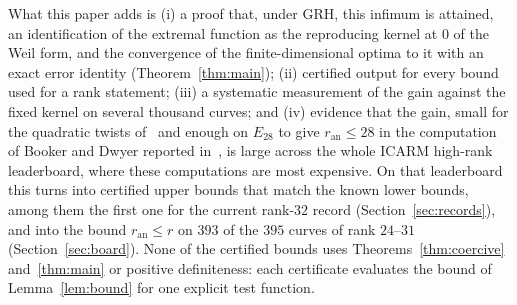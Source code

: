 \documentclass[11pt]{amsart}
\theoremstyle{remark}
\theoremstyle{definition}
\newcommand{\ran}{r_{\mathrm{an}}}
\begin{document}
What this paper adds is (i) a proof that, under GRH, this infimum is attained, an identification of the extremal function as the reproducing kernel at $0$ of the Weil form, and the convergence of the finite-dimensional optima to it with an exact error identity (Theorem~\ref{thm:main}); (ii) certified output for every bound used for a rank statement; (iii) a systematic measurement of the gain against the fixed kernel on several thousand curves; and (iv) evidence that the gain, small for the quadratic twists of~\cite{Watkins} and enough on $E_{28}$ to give $\ran\le28$ in the computation of Booker and Dwyer reported in~\cite{Bober}, is large across the whole ICARM high-rank leaderboard, where these computations are most expensive. On that leaderboard this turns into certified upper bounds that match the known lower bounds, among them the first one for the current rank-$32$ record (Section~\ref{sec:records}), and into the bound $\ran\le r$ on $393$ of the $395$ curves of rank $24$--$31$ (Section~\ref{sec:board}). None of the certified bounds uses Theorems~\ref{thm:coercive} and~\ref{thm:main} or positive definiteness: each certificate evaluates the bound of Lemma~\ref{lem:bound} for one explicit test function.
\end{document}
